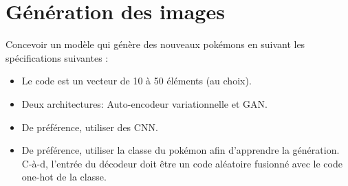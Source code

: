 \documentclass[11pt, a4paper]{article}
\begin{document}
\section*{Génération des images}

Concevoir un modèle qui génère des nouveaux pokémons en suivant les spécifications suivantes : 
\begin{itemize}
	\item Le code est un vecteur de 10 à 50 éléments (au choix).
	\item Deux architectures: Auto-encodeur variationnelle et GAN.
	\item De préférence, utiliser des CNN.
	\item De préférence, utiliser la classe du pokémon afin d'apprendre la génération. C-à-d, l'entrée du décodeur doit être un code aléatoire fusionné avec le code one-hot de la classe.
\end{itemize}
\end{document}
